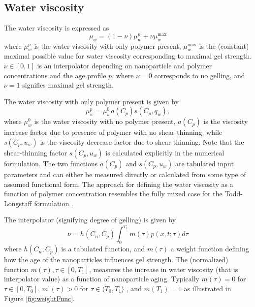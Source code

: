 \subsection{Water viscosity}
The water viscosity is expressed as
\begin{equation}
    \mu_w=(1-\nu)\mu^p_w + \nu\mu_w^{\max}
\end{equation}
where $\mu^p_w$ is the water viscosity with only polymer present, $\mu_w^{\max}$ is the (constant) maximal possible value for water viscosity corresponding to maximal gel strength. $\nu\in[0,1]$ is an interpolator depending on nanoparticle and polymer concentrations and the age profile $p$, where  $\nu=0$ corresponds to no gelling, and $\nu=1$  signifies maximal gel strength.

The water viscosity with only polymer present is given by
\begin{equation}
    \mu_w^p=\mu_w^0 a(C_p) s(C_p, q_w),
\end{equation}
where $\mu_w^0$ is the water viscosity with no polymer present, $a (C_p)$ is the viscosity increase factor due to presence of polymer with no shear-thinning, while $s(C_p, u_w)$ is the viscosity decrease factor due to shear thinning. Note that the shear-thinning factor $s(C_p, u_w)$ is calculated explicitly in the numerical formulation. The two functions $a (C_p)$ and $s(C_p, u_w)$ are tabulated input parameters and can either be measured directly or calculated from some type of assumed functional form. The approach for defining the water viscosity as a function of polymer concentration resembles the fully mixed case for the Todd-Longstaff formulation \citep{Todd1972}.   

The interpolator (signifying degree of gelling) is given by
\begin{equation} \label{eq:ageEffect} %
    \nu=h(C_n,C_p) \int^{T_1}_{0}m(\tau)p(x,t;\tau)d\tau
\end{equation}
where $h(C_n,C_p)$  is a tabulated function, and $m(\tau)$ a weight function defining how the age of the nanoparticles influences gel strength. The (normalized) function $m(\tau), \tau\in[0,T_1]$, measures the increase in water viscosity (that is interpolator value) as a function of nanoparticle aging. Typically $m(\tau)=0$ for $\tau\in[0,T_0]$,  $m^\prime(\tau)>0$ for $\tau\in\langle T_0, T_1\rangle$ , and $m(T_1)=1$ as illustrated in Figure \ref{fig:weightFunc}.

